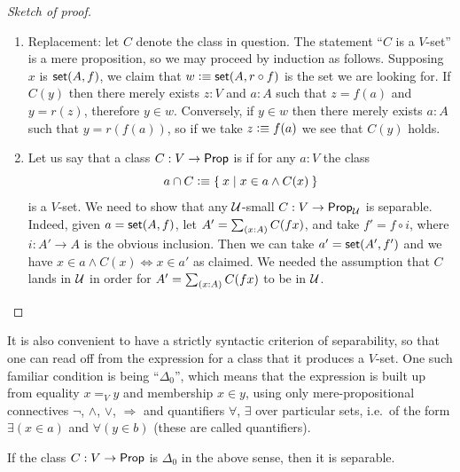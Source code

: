 \begin{proof}[Sketch of proof]
\begin{enumerate}
  \item Replacement: let $C$ denote the class in question.
    The statement ``$C$ is a $V$-set'' is a mere proposition, so we may
    proceed by induction as follows. Supposing $x$ is $\mathsf{set}(A, f)$, we claim that $w
    \vcentcolon\equiv \mathsf{set}(A, r \circ f)$ is the set we are looking for.  If $C(y)$ then there merely exists
    $z : V$ and $a : A$ such that $z = f(a)$ and $y = r(z)$, therefore $y \in w$.
    Conversely, if $y \in w$ then there merely exists $a : A$ such that $y = r(f(a))$, so
    if we take $z \vcentcolon\equiv f(a)$ we see that $C(y)$ holds.

  \item Let us say that a class $C: V\to\mathsf{Prop}$ is 
    if for any $a:V$ the class
  \begin{equation*}
    a \cap C \vcentcolon\equiv\Set{x | x\in a \wedge C(x)}
  \end{equation*}
  is a $V$-set.
We need to show that any $\mathcal{U}$-small  $C: V \to \mathsf{Prop}_\mathcal{U}$ is separable. Indeed, given $a=\mathsf{set}(A,f)$, let $A' = \sm{x:A}C(fx)$, and take $f' = f\circ i$, where $i : A' \to A$ is the obvious inclusion.  Then we can take $a' = \mathsf{set}(A',f')$ and we have $x\in a\wedge C(x) \Leftrightarrow x\in a'$ as claimed.  We needed the assumption that $C$ lands in $\mathcal{U}$ in order for $A' = \sm{x:A}C(fx)$ to be in $\mathcal{U}$.\qedhere
\end{enumerate}
\end{proof}

It is also convenient to have a strictly syntactic criterion of separability, so that one can read off from the expression for a class that it produces a $V$-set.  One such familiar condition is being ``$\Delta_0$'', which means that the expression is built up from equality $x=_V y$ and membership $x\in y$, using only mere-propositional connectives $\neg$, $\land$, $\lor$, $\Rightarrow$ and quantifiers $\forall$, $\exists$ over particular sets, i.e.\ of the form $\exists(x\in a)$ and $\forall(y\in b)$ (these are called  quantifiers).%

\begin{cor}\label{cor:Delta0sep}
If the class $C: V \to \mathsf{Prop}$ is $\Delta_0$ in the above sense, then it is separable.
\end{cor}
%

